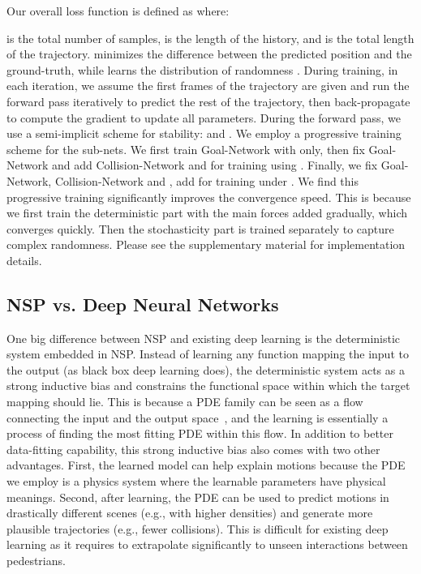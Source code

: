 \documentclass[runningheads]{llncs}
\begin{document}
Our overall loss function is defined as  where:


 is the total number of samples,  is the length of the history, and  is the total length of the trajectory.  minimizes the difference between the predicted position and the ground-truth, while  learns the distribution of randomness . During training, in each iteration, we assume the first  frames of the trajectory are given and run the forward pass iteratively to predict the rest of the trajectory, then back-propagate to compute the gradient to update all parameters. During the forward pass, we use a semi-implicit scheme for stability:  and .
We employ a progressive training scheme for the sub-nets. We first train Goal-Network with  only, then fix Goal-Network and add Collision-Network and  for training using . Finally, we fix Goal-Network, Collision-Network and , add  for training under . We find this progressive training significantly improves the convergence speed. This is because we first train the deterministic part with the main forces added gradually, which converges quickly. Then the stochasticity part is trained separately to capture complex randomness. Please see the supplementary material for implementation details.

\subsection{NSP vs. Deep Neural Networks}
One big difference between NSP and existing deep learning is the deterministic system embedded in NSP. Instead of learning any function mapping the input to the output (as black box deep learning does), the deterministic system acts as a strong inductive bias and constrains the functional space within which the target mapping should lie. This is because a PDE family can be seen as a flow connecting the input and the output space~\cite{alvarez1999pde}, and the learning is essentially a process of finding the most fitting PDE within this flow. In addition to better data-fitting capability, this strong inductive bias also comes with two other advantages. First, the learned model can help explain motions because the PDE we employ is a physics system where the learnable parameters have physical meanings. Second, after learning, the PDE can be used to predict motions in drastically different scenes (e.g., with higher densities) and generate more plausible trajectories (e.g., fewer collisions). This is difficult for existing deep learning as it requires to extrapolate significantly to unseen interactions between pedestrians. 
\end{document}
